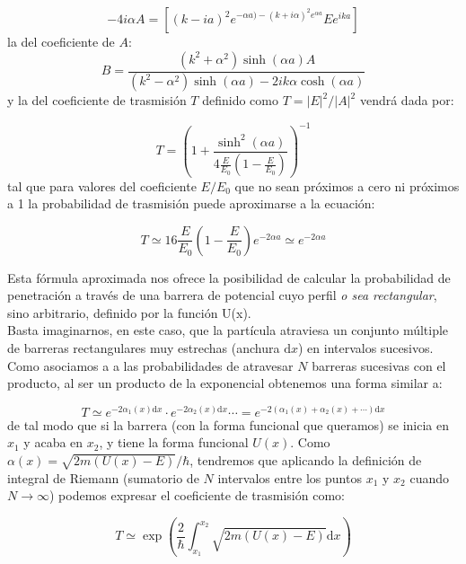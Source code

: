 \documentclass[12pt,a4paper]{article}
\numberwithin{equation}{section}
\numberwithin{figure}{section}
\newcommand{\parentesis}[1]{\left( #1  \right)}
\newcommand{\ccorchetes}[1]{\left[ #1  \right]}
\newcommand{\D}{\mathrm{d}}
\begin{document}
\begin{equation}
-4 i \alpha A = \ccorchetes{(k-ia)^2 e^{-\alpha a) - (k+i \alpha)^2 e^{\alpha a}}E e^{ika}}
\end{equation}
la del coeficiente de $A$:
\begin{equation}
B = \dfrac{(k^2 + \alpha^2) \sinh (\alpha a) A}{(k^2 - \alpha^2) \sinh (\alpha a) - 2 i k \alpha \cosh (\alpha a)}
\end{equation}
y la del coeficiente de trasmisión $T$ definido como $T=|E|^2 / |A|^2$ vendrá dada por:

\begin{equation}
T = \parentesis{1+ \dfrac{\sinh^2 (\alpha a)}{4 \frac{E}{E_0} \parentesis{1-\frac{E}{E_0}}}}^{-1}
\end{equation}
tal que para valores del coeficiente $E/E_0$ que no sean próximos a cero ni próximos a 1 la probabilidad de trasmisión puede aproximarse a la ecuación:

\begin{equation}
T \simeq 16 \dfrac{E}{E_0} \parentesis{1-\dfrac{E}{E_0}} e^{-2\alpha a} \simeq e^{-2 \alpha a}
\end{equation}

Esta fórmula aproximada nos ofrece la posibilidad de calcular la probabilidad de penetración a través de una barrera de potencial cuyo perfil \textit{o sea rectangular}, sino arbitrario, definido por la función U(x). \\

Basta imaginarnos, en este caso, que la partícula atraviesa un conjunto múltiple de barreras rectangulares muy estrechas (anchura $\D x$) en intervalos sucesivos. Como asociamos a a las probabilidades de atravesar $N$ barreras sucesivas con el producto, al ser un producto de la exponencial obtenemos una forma similar a:

\begin{equation}
T \simeq e^{-2 \alpha_1 (x) \D x } \cdot  e^{-2 \alpha_2 (x) \D x}  \cdots = e^{-2 (\alpha_1 (x) + \alpha_2(x) + \cdots) \D x}
\end{equation}
de tal modo que si la barrera (con la forma funcional que queramos) se inicia en $x_1$ y acaba en $x_2$, y tiene la forma funcional $U(x)$. Como $\alpha(x) = \sqrt{2m (U(x)-E)}/\hbar$, tendremos que aplicando la definición de integral de Riemann (sumatorio de $N$ intervalos entre los puntos $x_1$ y $x_2$ cuando $N \rightarrow \infty$) podemos expresar el coeficiente de trasmisión como: 

\begin{equation}
T \simeq \exp \parentesis{\frac{2}{\hbar} \int_{x_1}^{x_2}  \sqrt{2m (U(x) -E)} \D x}
\end{equation}
\end{document}
